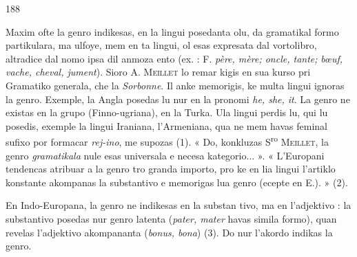 \begin{VUpage}[192]{188}

\VUsaut{1.10mm}
\VUsaut{4.27mm}

Maxim ofte la genro indikesas, en la lingui posedanta olu,\nl
da gramatikal formo partikulara, ma ulfoye, mem en ta\nl
lingui, ol esas expresata dal vortolibro, altradice dal nomo\nl
ipsa dil anmoza ento (ex. : F. \textit{père, mère; oncle, tante;}\nl
\textit{bœuf, vache, cheval, jument}). Sioro A. \textsc{Meillet} lo remar\cc
kigis en sua kurso pri Gramatiko generala, che la \textit{Sorbonne}.\nl
Il anke memorigis, ke multa lingui ignoras la genro.\nl
Exemple, la Angla posedas lu nur en la pronomi \textit{he, she, it}.\nl
La genro ne existas en la grupo (Finno-ugriana), en la Turka.\nl
Ula lingui perdis lu, qui lu posedis, exemple la lingui\nl
Iraniana, l'Armeniana, qua ne mem havas feminal sufixo\nl
por formacar \textit{rej-ino}, me supozas (1). « Do, konkluzas\nl
S\textsuperscript{ro} \textsc{Meillet}, la genro \textit{gramatikala} nule esas universala e\nl
necesa kategorio... ». « L'Europani tendencas atribuar a la\nl
genro tro granda importo, pro ke en lia lingui l'artiklo\nl
konstante akompanas la substantivo e memorigas lua genro\nl
(ecepte en E.). » (2).

En Indo-Europana, la genro ne indikesas en la substan\cc
tivo, ma en l'adjektivo : la substantivo posedas nur genro\nl
latenta (\textit{pater, mater} havas simila formo), quan revelas\nl
l'adjektivo akompananta (\textit{bonus, bona}) (3). Do nur l'akordo\nl
indikas la genro.
\end{VUpage}


